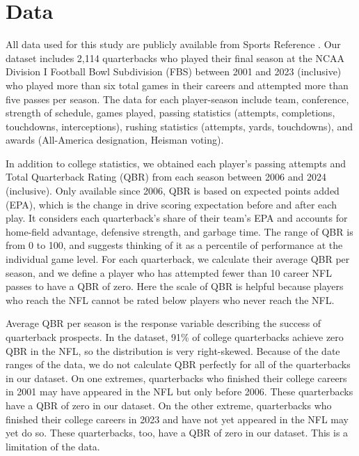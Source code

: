 \documentclass{article}
\begin{document}
\section{Data}
\label{sec:data}

All data used for this study are publicly available from Sports Reference \citep{sports_reference_sports_2025}. Our dataset includes 2,114 quarterbacks who played their final season at the NCAA Division I Football Bowl Subdivision (FBS) between 2001 and 2023 (inclusive) who played more than six total games in their careers and attempted more than five passes per season. The data for each player-season include team, conference, strength of schedule, games played, passing statistics (attempts, completions, touchdowns, interceptions), rushing statistics (attempts, yards, touchdowns), and awards (All-America designation, Heisman voting).

In addition to college statistics, we obtained each player's passing attempts and Total Quarterback Rating (QBR) \citep{burke_how_2016} from each season between 2006 and 2024 (inclusive). Only available since 2006, QBR is based on expected points added (EPA), which is the change in drive scoring expectation before and after each play. It considers each quarterback's share of their team's EPA and accounts for home-field advantage, defensive strength, and garbage time. The range of QBR is from 0 to 100, and \citet{burke_how_2016} suggests thinking of it as a percentile of performance at the individual game level. For each quarterback, we calculate their average QBR per season, and we define a player who has attempted fewer than 10 career NFL passes to have a QBR of zero. Here the scale of QBR is helpful because players who reach the NFL cannot be rated below players who never reach the NFL.

Average QBR per season is the response variable describing the success of quarterback prospects. In the dataset, 91\% of college quarterbacks achieve zero QBR in the NFL, so the distribution is very right-skewed. Because of the date ranges of the data, we do not calculate QBR perfectly for all of the quarterbacks in our dataset. On one extremes, quarterbacks who finished their college careers in 2001 may have appeared in the NFL but only before 2006. These quarterbacks have a QBR of zero in our dataset. On the other extreme, quarterbacks who finished their college careers in 2023 and have not yet appeared in the NFL may yet do so. These quarterbacks, too, have a QBR of zero in our dataset. This is a limitation of the data.
\end{document}

